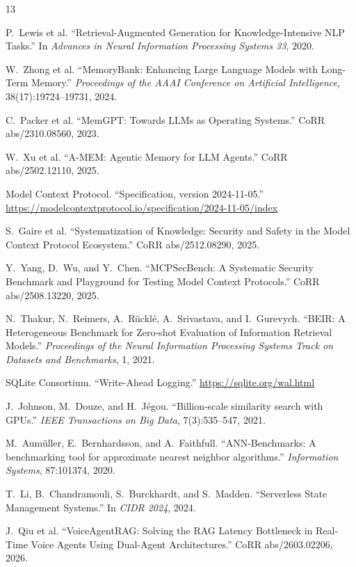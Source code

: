 \documentclass{article}
\begin{document}
{\small\sloppy
\begin{thebibliography}{13}

P.~Lewis et al.
``Retrieval-Augmented Generation for Knowledge-Intensive NLP Tasks.''
In \emph{Advances in Neural Information Processing Systems 33}, 2020.

W.~Zhong et al.
``MemoryBank: Enhancing Large Language Models with Long-Term Memory.''
\emph{Proceedings of the AAAI Conference on Artificial Intelligence}, 38(17):19724--19731, 2024.

C.~Packer et al.
``MemGPT: Towards LLMs as Operating Systems.''
CoRR abs/2310.08560, 2023.

W.~Xu et al.
``A-MEM: Agentic Memory for LLM Agents.''
CoRR abs/2502.12110, 2025.

Model Context Protocol.
``Specification, version 2024-11-05.''
\url{https://modelcontextprotocol.io/specification/2024-11-05/index}

S.~Gaire et al.
``Systematization of Knowledge: Security and Safety in the Model Context Protocol Ecosystem.''
CoRR abs/2512.08290, 2025.

Y.~Yang, D.~Wu, and Y.~Chen.
``MCPSecBench: A Systematic Security Benchmark and Playground for Testing Model Context Protocols.''
CoRR abs/2508.13220, 2025.

N.~Thakur, N.~Reimers, A.~R\"uckl\'e, A.~Srivastava, and I.~Gurevych.
``BEIR: A Heterogeneous Benchmark for Zero-shot Evaluation of Information Retrieval Models.''
\emph{Proceedings of the Neural Information Processing Systems Track on Datasets and Benchmarks}, 1, 2021.

SQLite Consortium.
``Write-Ahead Logging.''
\url{https://sqlite.org/wal.html}

J.~Johnson, M.~Douze, and H.~J\'egou.
``Billion-scale similarity search with GPUs.''
\emph{IEEE Transactions on Big Data}, 7(3):535--547, 2021.

M.~Aum\"uller, E.~Bernhardsson, and A.~Faithfull.
``ANN-Benchmarks: A benchmarking tool for approximate nearest neighbor algorithms.''
\emph{Information Systems}, 87:101374, 2020.

T.~Li, B.~Chandramouli, S.~Burckhardt, and S.~Madden.
``Serverless State Management Systems.''
In \emph{CIDR 2024}, 2024.

J.~Qiu et al.
``VoiceAgentRAG: Solving the RAG Latency Bottleneck in Real-Time Voice Agents Using Dual-Agent Architectures.''
CoRR abs/2603.02206, 2026.

\end{thebibliography}
}
\end{document}

